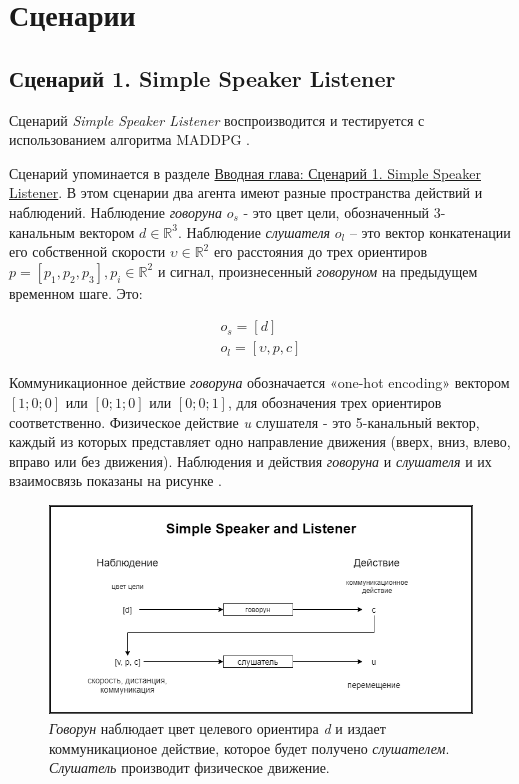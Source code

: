 \section{Сценарии}

\subsection{Сценарий 1. Simple Speaker Listener}  \label{exp-ssl}

Сценарий \textit{Simple Speaker Listener} воспроизводится и тестируется с использованием алгоритма MADDPG \cite{lowe2017multiagent}.

Сценарий упоминается в разделе \hyperref[intro:ssl]{Вводная глава: Сценарий 1. Simple Speaker Listener}. В этом сценарии два агента имеют разные пространства действий и наблюдений. Наблюдение \textit{говоруна} $o_s$ - это цвет цели, обозначенный 3- канальным вектором $d \in \mathbb{R}^3$. Наблюдение \textit{слушателя} $o_l$ – это вектор конкатенации его собственной скорости $\upsilon \in \mathbb{R}^2$ его расстояния до трех ориентиров $p = [p_1, p_2, p_3], p_i \in \mathbb{R}^2$ и сигнал, произнесенный \textit{говоруном} на предыдущем временном шаге. Это:

\begin{equation}
    \begin{multlined}
        o_s = [d] \\
        o_l = [\upsilon, p, c]
    \end{multlined}
\end{equation}

Коммуникационное действие \textit{говоруна} обозначается «one-hot encoding» вектором $[1; 0; 0]$ или $[0; 1; 0]$ или $[0; 0; 1]$, для обозначения трех ориентиров соответственно.
Физическое действие \textit{u} слушателя - это 5-канальный вектор, каждый из которых представляет одно направление движения (вверх, вниз, влево, вправо или без движения). Наблюдения и действия \textit{говоруна} и \textit{слушателя} и их взаимосвязь показаны на рисунке .

\begin{figure}[ht!]
    \center
    \includegraphics [scale=0.60] {my_folder/images/ch4/simple_speaker_listener.png}
    \caption{\textit{Говорун} наблюдает цвет целевого ориентира \textit{d} и издает коммуникационое действие, которое будет получено \textit{слушателем}. \textit{Слушатель} производит физическое движение.}
    \label{fig:ch4-ssl}
\end{figure}

